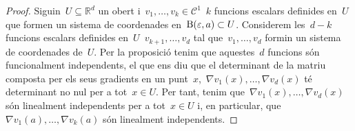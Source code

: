 \documentclass[../calcul-en-diverses-variables.tex]{subfiles}
\begin{document}
    \begin{proof}
        Siguin~\(U\subseteq\mathbb{R}^{d}\) un obert i~\(v_{1},\dots,v_{k}\in\mathcal{C}^{1}\)~\(k\) funcions escalars definides en~\(U\) que formen un sistema de coordenades en~\(\operatorname{B}(\varepsilon,a)\subset U\).
        Considerem les~\(d-k\) funcions escalars definides en~\(U\)~\(v_{k+1},\dots,v_{d}\) tal que~\(v_{1},\dots,v_{d}\) formin un sistema de coordenades de~\(U\).
        Per la proposició  tenim que aquestes~\(d\) funcions són funcionalment independents, el que ens diu que el determinant de la matriu composta per els seus gradients en un punt~\(x\),~\(\nabla v_{1}(x),\dots,\nabla v_{d}(x)\) té determinant no nul per a tot~\(x\in U\).
        Per tant, tenim que~\(\nabla v_{1}(x),\dots,\nabla v_{d}(x)\) són linealment independents per a tot~\(x\in U\) i, en particular, que~\(\nabla v_{1}(a),\dots,\nabla v_{k}(a)\) són linealment independents.
    \end{proof}
\end{document}
